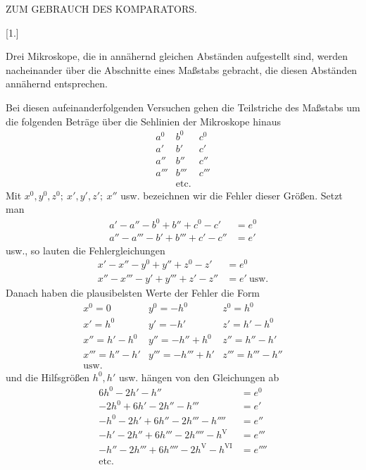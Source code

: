 \begin{center}ZUM GEBRAUCH DES KOMPARATORS.\end{center}
\begin{center}[1.]\end{center}
Drei Mikroskope, die in annähernd gleichen Abständen aufgestellt sind, werden nacheinander über die Abschnitte eines Maßstabs gebracht, die diesen Abständen annähernd entsprechen.

Bei diesen aufeinanderfolgenden Versuchen gehen die Teilstriche des Maßstabs um die folgenden Beträge über die Sehlinien der Mikroskope hinaus
\[
\begin{array}{ccc}
a^0&b^0&c^0\\
a'&b'&c'\\
a''&b''&c''\\
a'''&b'''&c'''\\
&\text{etc.}&
\end{array}
\]
Mit $x^0,y^0,z^0;\ x',y',z';\ x''$ usw. bezeichnen wir die Fehler dieser Größen. Setzt man
\[
\begin{aligned}
a'-a''-b^0+b''+c^0-c'&=e^0\\
a''-a'''-b'+b'''+c'-c''&=e'
\end{aligned}
\]
usw., so lauten die Fehlergleichungen
\[
\begin{aligned}
x'-x''-y^0+y''+z^0-z'&=e^0\\
x''-x'''-y'+y'''+z'-z''&=e'\ \text{usw.}
\end{aligned}
\]
Danach haben die plausibelsten Werte der Fehler die Form
\[
\begin{array}{lll}
x^0=0&y^0=-h^0&z^0=h^0\\
x'=h^0&y'=-h'&z'=h'-h^0\\
x''=h'-h^0&y''=-h''+h^0&z''=h''-h'\\
x'''=h''-h'&y'''=-h'''+h'&z'''=h'''-h''\\
\text{usw.}&&
\end{array}
\]
und die Hilfsgrößen $h^0,h'$ usw. hängen von den Gleichungen ab
\[
\begin{aligned}
6h^0-2h'-h''&=e^0\\
-2h^0+6h'-2h''-h'''&=e'\\
-h^0-2h'+6h''-2h'''-h''''&=e''\\
-h'-2h''+6h'''-2h''''-h^{\mathrm V}&=e'''\\
-h''-2h'''+6h''''-2h^{\mathrm V}-h^{\mathrm {VI}}&=e''''\\
\text{etc.}&
\end{aligned}
\]

